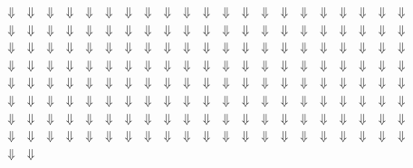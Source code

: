\documentclass[12pt,twocolumn]{article}
\begin{document}
\begin{center}
$\Downarrow$
$\Downarrow$
$\Downarrow$
$\Downarrow$
$\Downarrow$
$\Downarrow$
$\Downarrow$
$\Downarrow$
$\Downarrow$
$\Downarrow$
$\Downarrow$
$\Downarrow$
$\Downarrow$
$\Downarrow$
$\Downarrow$
$\Downarrow$
$\Downarrow$
$\Downarrow$
$\Downarrow$
$\Downarrow$
$\Downarrow$\\
$\Downarrow$
$\Downarrow$
$\Downarrow$
$\Downarrow$
$\Downarrow$
$\Downarrow$
$\Downarrow$
$\Downarrow$
$\Downarrow$
$\Downarrow$
$\Downarrow$
$\Downarrow$
$\Downarrow$
$\Downarrow$
$\Downarrow$
$\Downarrow$
$\Downarrow$
$\Downarrow$
$\Downarrow$
$\Downarrow$
$\Downarrow$\\
$\Downarrow$
$\Downarrow$
$\Downarrow$
$\Downarrow$
$\Downarrow$
$\Downarrow$
$\Downarrow$
$\Downarrow$
$\Downarrow$
$\Downarrow$
$\Downarrow$
$\Downarrow$
$\Downarrow$
$\Downarrow$
$\Downarrow$
$\Downarrow$
$\Downarrow$
$\Downarrow$
$\Downarrow$
$\Downarrow$
$\Downarrow$\\
$\Downarrow$
$\Downarrow$
$\Downarrow$
$\Downarrow$
$\Downarrow$
$\Downarrow$
$\Downarrow$
$\Downarrow$
$\Downarrow$
$\Downarrow$
$\Downarrow$
$\Downarrow$
$\Downarrow$
$\Downarrow$
$\Downarrow$
$\Downarrow$
$\Downarrow$
$\Downarrow$
$\Downarrow$
$\Downarrow$
$\Downarrow$\\
$\Downarrow$
$\Downarrow$
$\Downarrow$
$\Downarrow$
$\Downarrow$
$\Downarrow$
$\Downarrow$
$\Downarrow$
$\Downarrow$
$\Downarrow$
$\Downarrow$
$\Downarrow$
$\Downarrow$
$\Downarrow$
$\Downarrow$
$\Downarrow$
$\Downarrow$
$\Downarrow$
$\Downarrow$
$\Downarrow$
$\Downarrow$\\
$\Downarrow$
$\Downarrow$
$\Downarrow$
$\Downarrow$
$\Downarrow$
$\Downarrow$
$\Downarrow$
$\Downarrow$
$\Downarrow$
$\Downarrow$
$\Downarrow$
$\Downarrow$
$\Downarrow$
$\Downarrow$
$\Downarrow$
$\Downarrow$
$\Downarrow$
$\Downarrow$
$\Downarrow$
$\Downarrow$
$\Downarrow$\\
$\Downarrow$
$\Downarrow$
$\Downarrow$
$\Downarrow$
$\Downarrow$
$\Downarrow$
$\Downarrow$
$\Downarrow$
$\Downarrow$
$\Downarrow$
$\Downarrow$
$\Downarrow$
$\Downarrow$
$\Downarrow$
$\Downarrow$
$\Downarrow$
$\Downarrow$
$\Downarrow$
$\Downarrow$
$\Downarrow$
$\Downarrow$\\
$\Downarrow$
$\Downarrow$
$\Downarrow$
$\Downarrow$
$\Downarrow$
$\Downarrow$
$\Downarrow$
$\Downarrow$
$\Downarrow$
$\Downarrow$
$\Downarrow$
$\Downarrow$
$\Downarrow$
$\Downarrow$
$\Downarrow$
$\Downarrow$
$\Downarrow$
$\Downarrow$
$\Downarrow$
$\Downarrow$
$\Downarrow$\\
$\Downarrow$
$\Downarrow$

\end{center}
\end{document}
